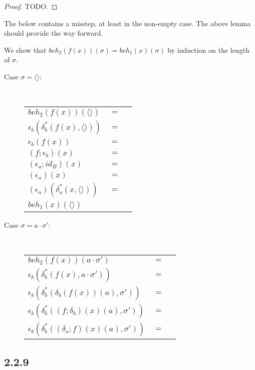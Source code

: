 \documentclass{article}
\begin{document}
\begin{proof}
TODO.
\end{proof}

The below contains a misstep, at least in the non-empty case. The above lemma should provide the way forward. 

We show that $\mathit{beh}_2(f(x))(\sigma) = \mathit{beh}_1(x)(\sigma)$ by induction on the length of $\sigma$.
\begin{description}
\item[Case $\sigma = \langle \rangle$:]~\\

\begin{tabular}{lll}
$beh_2(f(x))(\langle \rangle)$ & $=$ & \\
$\epsilon_b(\delta_b^*(f(x),\langle \rangle))$ & $=$ & \\
$\epsilon_b(f(x))$ & $=$ & \\
$(f;\epsilon_b)(x)$ & $=$ & \\
$(\epsilon_a;id_B)(x)$ & $=$ \\
$(\epsilon_a)(x)$ & $=$ & \\
$(\epsilon_a)(\delta_a^*(x, \langle \rangle))$ & $=$ & \\
$beh_1(x)(\langle \rangle)$ & & 
\end{tabular}

\item[Case $\sigma = a \cdot \sigma'$:]~\\

\begin{tabular}{lll}
$beh_2(f(x))(a \cdot \sigma')$ & $=$ & \\
$\epsilon_b(\delta_b^*(f(x),a \cdot \sigma'))$ & $=$ & \\
$\epsilon_b(\delta_b^*(\delta_b(f(x))(a),\sigma'))$ & $=$ & \\
$\epsilon_b(\delta_b^*((f;\delta_b)(x)(a),\sigma'))$ & $=$ & \\
$\epsilon_b(\delta_b^*((\delta_a;f)(x)(a),\sigma'))$ & $=$ & \\
\end{tabular}

\end{description} 

\subsection*{2.2.9}
\end{document}
